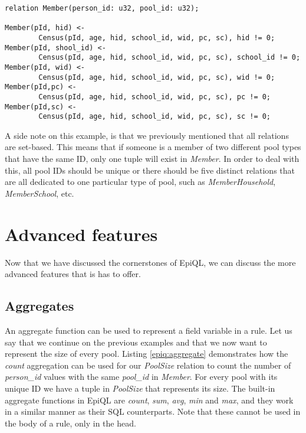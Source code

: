 \begin{lstlisting}[caption={Rules filling the \textit{Member} relation to represent the pools of which someone is a member of.}, label={epiq:simple_rule2}]
relation Member(person_id: u32, pool_id: u32);

Member(pId, hid) <-
        Census(pId, age, hid, school_id, wid, pc, sc), hid != 0;
Member(pId, shool_id) <-
        Census(pId, age, hid, school_id, wid, pc, sc), school_id != 0;
Member(pId, wid) <-
        Census(pId, age, hid, school_id, wid, pc, sc), wid != 0;
Member(pId,pc) <-
        Census(pId, age, hid, school_id, wid, pc, sc), pc != 0;
Member(pId,sc) <-
        Census(pId, age, hid, school_id, wid, pc, sc), sc != 0;
\end{lstlisting}

A side note on this example, is that we previously mentioned that all relations are set-based. This means that if someone is a member of two different pool types that have the same ID, only one tuple will exist in \textit{Member}. In order to deal with this, all pool IDs should be unique or there should be five distinct relations that are all dedicated to one particular type of pool, such as \textit{MemberHousehold}, \textit{MemberSchool}, etc.

\section{Advanced features}
\label{sec:advanced_features}
Now that we have discussed the cornerstones of EpiQL, we can discuss the more advanced features that is has to offer.

\subsection{Aggregates}
\label{subsec:aggregates}
An aggregate function can be used to represent a field variable in a rule. Let us say that we continue on the previous examples and that we now want to represent the size of every pool. Listing \ref{epiq:aggregate} demonstrates how the \textit{count} aggregation can be used for our \textit{PoolSize} relation to count the number of \textit{person\_id} values with the same \textit{pool\_id} in \textit{Member}. For every pool with its unique ID we have a tuple in \textit{PoolSize} that represents its size. The built-in aggregate functions in EpiQL are \textit{count}, \textit{sum}, \textit{avg}, \textit{min} and \textit{max}, and they work in a similar manner as their SQL counterparts. Note that these cannot be used in the body of a rule, only in the head.

